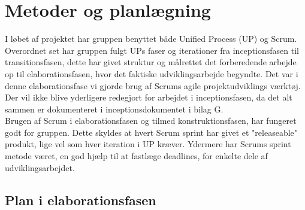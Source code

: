 \section{Metoder og planlægning}
I løbet af projektet har gruppen benyttet både Unified Process (UP) og Scrum. Overordnet set har gruppen fulgt UPs faser og iterationer fra inceptionsfasen til transitionsfasen, dette har givet struktur og målrettet det forberedende arbejde op til elaborationsfasen, hvor det faktiske udviklingsarbejde begyndte. Det var i denne elaborationsfase vi gjorde brug af Scrums agile projektudviklings værktøj. 
Der vil ikke blive yderligere redegjort for arbejdet i inceptionsfasen, da det alt sammen er dokumenteret i inceptionsdokumentet i bilag G.  \\
Brugen af Scrum i elaborationsfasen og tilmed konstruktionsfasen, har fungeret godt for gruppen. Dette skyldes at hvert Scrum sprint har givet et "releaseable" produkt, lige vel som hver iteration i UP kræver. Ydermere har Scrums sprint metode været, en god hjælp til at fastlæge deadlines, for enkelte dele af udviklingsarbejdet.

\subsection{Plan i elaborationsfasen}

